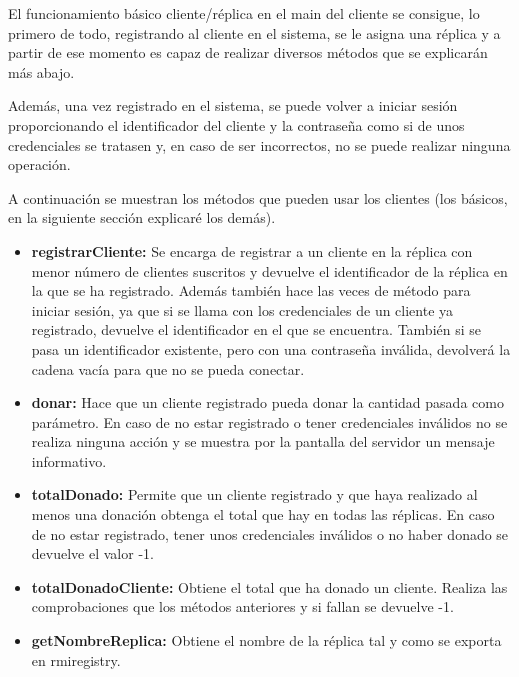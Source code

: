 \documentclass{article}
\begin{document}
\bigskip

El funcionamiento básico cliente/réplica en el main del cliente se consigue, lo primero de todo, registrando al cliente en el sistema, se le asigna una réplica y a partir de ese momento es capaz de realizar diversos métodos que se explicarán más abajo.

\bigskip

Además, una vez registrado en el sistema, se puede volver a iniciar sesión proporcionando el identificador del cliente y la contraseña como si de unos credenciales se tratasen y, en caso de ser incorrectos, no se puede realizar ninguna operación.

\bigskip

A continuación se muestran los métodos que pueden usar los clientes (los básicos, en la siguiente sección explicaré los demás).

\begin{itemize}
    \item \textbf{registrarCliente: }Se encarga de registrar a un cliente en la réplica con menor número de clientes suscritos y devuelve el identificador de la réplica en la que se ha registrado. Además también hace las veces de método para iniciar sesión, ya que si se llama con los credenciales de un cliente ya registrado, devuelve el identificador en el que se encuentra. También si se pasa un identificador existente, pero con una contraseña inválida, devolverá la cadena vacía para que no se pueda conectar.
    
    \item \textbf{donar: }Hace que un cliente registrado pueda donar la cantidad pasada como parámetro. En caso de no estar registrado o tener credenciales inválidos no se realiza ninguna acción y se muestra por la pantalla del servidor un mensaje informativo.

    \item \textbf{totalDonado: }Permite que un cliente registrado y que haya realizado al menos una donación obtenga el total que hay en todas las réplicas. En caso de no estar registrado, tener unos credenciales inválidos o no haber donado se devuelve el valor -1.
    
    \item \textbf{totalDonadoCliente: }Obtiene el total que ha donado un cliente. Realiza las comprobaciones que los métodos anteriores y si fallan se devuelve -1.\
    
    \item \textbf{getNombreReplica: }Obtiene el nombre de la réplica tal y como se exporta en rmiregistry.
\end{itemize}
\end{document}
